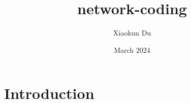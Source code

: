 \documentclass{article}
\title{network-coding}
\author{Xiaokun Du}
\date{March 2024}
\begin{document}
\maketitle

\section{Introduction}
\end{document}
